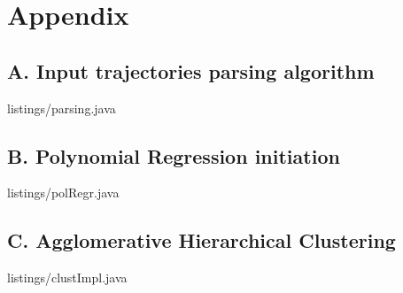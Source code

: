 \section*{Appendix}

\bigbreak

\subsection*{A. Input trajectories parsing algorithm}
\lstset{style=code-style-java}
 {listings/parsing.java}

\bigbreak

\subsection*{B. Polynomial Regression initiation}
 {listings/polRegr.java}

\bigbreak

\subsection*{C. Agglomerative Hierarchical Clustering}
 {listings/clustImpl.java}

\bigbreak


